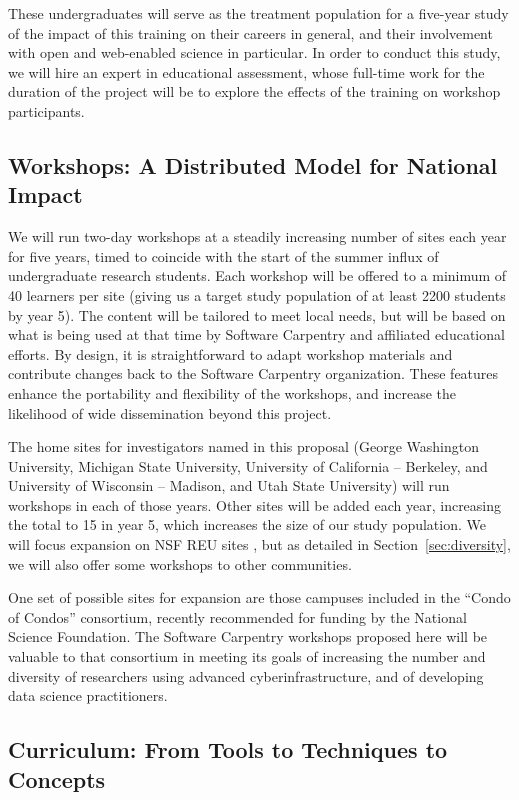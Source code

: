 \documentclass{proposalnsf}
\begin{document}
These undergraduates will serve as the treatment population for a
five-year study of the impact of this training on their careers in
general, and their involvement with open and web-enabled science in
particular.  In order to conduct this study, we will hire an expert in
educational assessment, whose full-time work for the duration of the
project will be to explore the effects of the training on workshop
participants.

\subsection{Workshops: A Distributed Model for National Impact}

We will run two-day workshops at a steadily increasing number of sites
each year for five years, timed to coincide with the start of the
summer influx of undergraduate research students.  Each workshop will
be offered to a minimum of 40 learners per site (giving us a target
study population of at least 2200 students by year 5).  The content will be
tailored to meet local needs, but will be based on what is being used
at that time by Software Carpentry and affiliated educational efforts.
By design, it is straightforward to adapt workshop materials and
contribute changes back to the Software Carpentry organization.  These
features enhance the portability and flexibility of the workshops, and
increase the likelihood of wide dissemination beyond this project.

The home sites for investigators named in this proposal (George
Washington University, Michigan State University, University of
California -- Berkeley, and University of Wisconsin -- Madison, and
Utah State University) will run workshops in each of those years.
Other sites will be added each year, increasing the total to 15 in
year 5, which increases the size of our study population.  We will
focus expansion on NSF REU sites \cite{nsfreu}, but as detailed in
Section~\ref{sec:diversity}, we will also offer some workshops to
other communities.

One set of possible sites for expansion are those campuses included in
the ``Condo of Condos'' consortium, recently recommended for funding
by the National Science Foundation.  The Software Carpentry workshops
proposed here will be valuable to that consortium in meeting its goals
of increasing the number and diversity of researchers using advanced
cyberinfrastructure, and of developing data science practitioners.

\subsection{Curriculum: From Tools to Techniques to Concepts}
\end{document}
